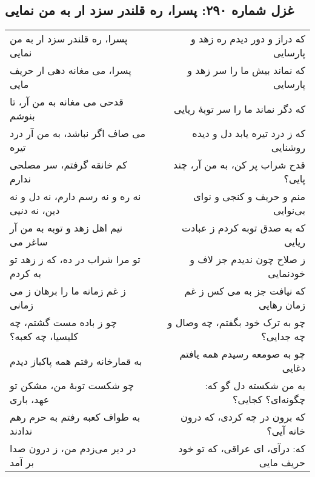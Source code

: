 \begin{center}
\section*{غزل شماره ۲۹۰: پسرا، ره قلندر سزد ار به من نمایی}
\label{sec:290}
\begin{longtable}{l p{0.5cm} r}
پسرا، ره قلندر سزد ار به من نمایی
&&
که دراز و دور دیدم ره زهد و پارسایی
\\
پسرا، می مغانه دهی ار حریف مایی
&&
که نماند بیش ما را سر زهد و پارسایی
\\
قدحی می مغانه به من آر، تا بنوشم
&&
که دگر نماند ما را سر توبهٔ ریایی
\\
می صاف اگر نباشد، به من آر درد تیره
&&
که ز درد تیره یابد دل و دیده روشنایی
\\
کم خانقه گرفتم، سر مصلحی ندارم
&&
قدح شراب پر کن، به من آر، چند پایی؟
\\
نه ره و نه رسم دارم، نه دل و نه دین، نه دنیی
&&
منم و حریف و کنجی و نوای بی‌نوایی
\\
نیم اهل زهد و توبه به من آر ساغر می
&&
که به صدق توبه کردم ز عبادت ریایی
\\
تو مرا شراب در ده، که ز زهد تو به کردم
&&
ز صلاح چون ندیدم جز لاف و خودنمایی
\\
ز غم زمانه ما را برهان ز می زمانی
&&
که نیافت جز به می کس ز غم زمان رهایی
\\
چو ز باده مست گشتم، چه کلیسیا، چه کعبه؟
&&
چو به ترک خود بگفتم، چه وصال و چه جدایی؟
\\
به قمارخانه رفتم همه پاکباز دیدم
&&
چو به صومعه رسیدم همه یافتم دغایی
\\
چو شکست توبهٔ من، مشکن تو عهد، باری
&&
به من شکسته دل گو که: چگونه‌ای؟ کجایی؟
\\
به طواف کعبه رفتم به حرم رهم ندادند
&&
که برون در چه کردی، که درون خانه آیی؟
\\
در دیر می‌زدم من، ز درون صدا بر آمد
&&
که: درآی، ای عراقی، که تو خود حریف مایی
\\
\end{longtable}
\end{center}
